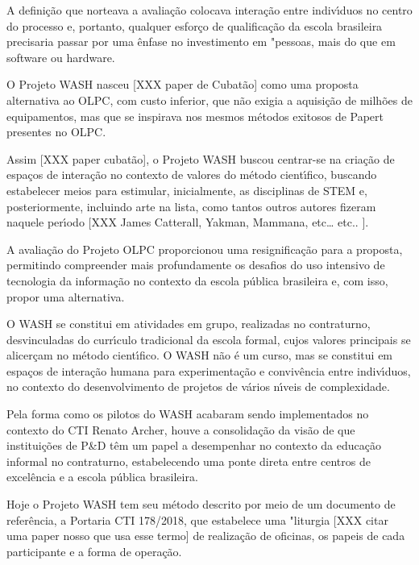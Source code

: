 \documentclass[
12pt,		%
openright,	%
twoside,  %
a4paper,			%
chapter=TITLE,		%
english,			%
french,				%
spanish,			%
brazil				%
]{USPSC-classe/USPSC}
\begin{document}
A defini\c{c}\~ao que norteava a avalia\c{c}\~ao colocava intera\c{c}\~ao entre indiv\'{\i}duos no centro do processo e, portanto, qualquer esfor\c{c}o de qualifica\c{c}\~ao da escola brasileira precisaria passar por uma \^enfase no investimento em "pessoas, mais do que em software ou hardware.




O Projeto WASH nasceu [XXX paper de Cubat\~ao] como uma proposta alternativa ao OLPC, com custo inferior, que n\~ao exigia a aquisi\c{c}\~ao de milh\~oes de equipamentos, mas que se inspirava nos mesmos m\'etodos exitosos de Papert presentes no OLPC.




Assim [XXX paper cubat\~ao], o Projeto WASH buscou centrar-se na cria\c{c}\~ao de espa\c{c}os de intera\c{c}\~ao no contexto de valores do m\'etodo cient\'{\i}fico, buscando estabelecer meios para estimular, inicialmente, as disciplinas de STEM e, posteriormente, incluindo arte na lista, como tantos outros autores fizeram naquele per\'{\i}odo [XXX James Catterall, Yakman, Mammana, etc… etc.. ].




A avalia\c{c}\~ao do Projeto OLPC proporcionou uma resignifica\c{c}\~ao para a proposta, permitindo compreender mais profundamente os desafios do uso intensivo de tecnologia da informa\c{c}\~ao no contexto da escola p\'ublica brasileira e, com isso, propor uma alternativa.




O WASH se constitui em atividades em grupo, realizadas no contraturno, desvinculadas do curr\'{\i}culo tradicional da escola formal, cujos valores principais se alicer\c{c}am no m\'etodo cient\'{\i}fico. O WASH n\~ao \'e um curso, mas se constitui em espa\c{c}os de intera\c{c}\~ao humana para experimenta\c{c}\~ao e conviv\^encia entre indiv\'{\i}duos, no contexto do desenvolvimento de projetos de v\'arios n\'{\i}veis de complexidade.




Pela forma como os pilotos do WASH acabaram sendo implementados no contexto do CTI Renato Archer, houve a consolida\c{c}\~ao da vis\~ao de que institui\c{c}\~oes de P\&D t\^em um papel a desempenhar no contexto da educa\c{c}\~ao informal no contraturno, estabelecendo uma ponte direta entre centros de excel\^encia e a escola p\'ublica brasileira.




Hoje o Projeto WASH tem seu m\'etodo descrito por meio de um documento de refer\^encia, a Portaria CTI 178/2018, que estabelece uma "liturgia [XXX citar uma paper nosso que usa esse termo] de realiza\c{c}\~ao de oficinas, os papeis de cada participante e a forma de opera\c{c}\~ao. 
\end{document}
